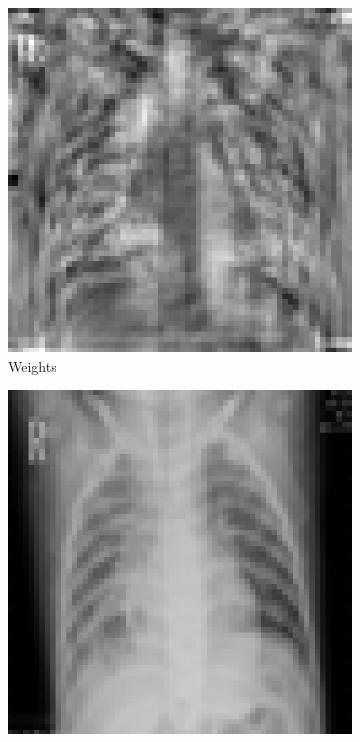 \documentclass{article}
\begin{document}
\begin{figure}[!ht]
\centering
\caption*{Weights of the Perceptron after 25 epochs on a single prediction.}
\begin{subfigure}{0.25\textwidth}
  \includegraphics[width=\linewidth]{assets/perceptron/training-1-weights.png}
  \caption*{Weights}\label{fig:training-1-weights}
\end{subfigure}
\xspace
\begin{subfigure}{0.25\textwidth}
  \includegraphics[width=\linewidth]{assets/perceptron/training-1-predict.png}

\end{subfigure}
\end{figure}
\end{document}
